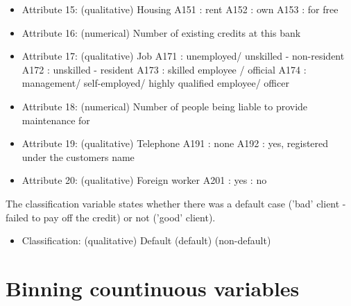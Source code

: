 \documentclass[10pt]{article}\usepackage[]{graphicx}\usepackage[]{color}
\begin{document}
\begin{itemize}
\item Attribute 15: (qualitative) Housing 
\newline A151 : rent 
\newline A152 : own 
\newline A153 : for free 

\item Attribute 16: (numerical) Number of existing credits at this bank 

\item Attribute 17: (qualitative) Job 
\newline A171 : unemployed/ unskilled - non-resident 
\newline A172 : unskilled - resident 
\newline A173 : skilled employee / official 
\newline A174 : management/ self-employed/ highly qualified employee/ officer 

\item Attribute 18: (numerical) Number of people being liable to provide maintenance for 

\item Attribute 19: (qualitative) Telephone 
\newline A191 : none 
\newline A192 : yes, registered under the customers name 

\item Attribute 20: (qualitative) Foreign worker 
\newline A201 : yes 
 : no 
\end{itemize}

The classification variable states whether there was a default case ('bad' client - failed to pay off the credit) or not ('good' client). 

\begin{itemize}
\item Classification: (qualitative) Default
 (default)
 (non-default)
\end{itemize}






\section{Binning countinuous variables}
\end{document}
